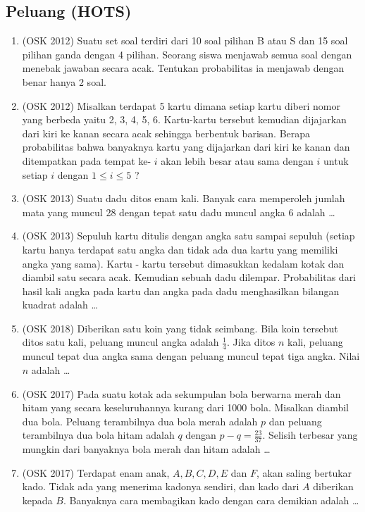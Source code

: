 \documentclass[12pt]{scrartcl}
\begin{document}
\subsection{Peluang (HOTS)}
\begin{enumerate}
            \item (OSK 2012) Suatu set soal terdiri dari 10 soal pilihan B atau S dan 15 soal pilihan ganda dengan 4 pilihan. Seorang siswa menjawab semua soal dengan menebak jawaban secara acak. Tentukan probabilitas ia menjawab dengan benar hanya 2 soal.
            
            \item (OSK 2012) Misalkan terdapat 5 kartu dimana setiap kartu diberi nomor yang berbeda yaitu 2, 3, 4, 5, 6. Kartu-kartu tersebut kemudian dijajarkan dari kiri ke kanan secara acak sehingga berbentuk barisan. Berapa probabilitas bahwa banyaknya kartu yang dijajarkan dari kiri ke kanan dan ditempatkan pada tempat ke- $i$ akan lebih besar atau sama dengan $i$ untuk setiap $i$ dengan $1 \le i \le 5$ ?
            
            \item (OSK 2013) Suatu dadu ditos enam kali. Banyak cara memperoleh jumlah mata yang muncul 28 dengan tepat satu dadu muncul angka 6 adalah \dots
            
            \item (OSK 2013) Sepuluh kartu ditulis dengan angka satu sampai sepuluh (setiap kartu hanya terdapat satu angka dan tidak ada dua kartu yang memiliki angka yang sama). Kartu - kartu tersebut dimasukkan kedalam kotak dan diambil satu secara acak. Kemudian sebuah dadu dilempar. Probabilitas dari hasil kali angka pada kartu dan angka pada dadu menghasilkan bilangan kuadrat adalah \dots
            
            \item (OSK 2018) Diberikan satu koin yang tidak seimbang. Bila koin tersebut ditos satu kali, peluang muncul angka adalah $\frac{1}{4}$. Jika ditos $n$ kali, peluang muncul tepat dua angka sama dengan peluang muncul tepat tiga angka. Nilai $n$ adalah \dots
            
            \item (OSK 2017) Pada suatu kotak ada sekumpulan bola berwarna merah dan hitam yang secara keseluruhannya kurang dari 1000 bola. Misalkan diambil dua bola. Peluang terambilnya dua bola merah adalah $p$ dan peluang terambilnya dua bola hitam adalah $q$ dengan $p-q =\frac{23}{37}$. Selisih terbesar yang mungkin dari banyaknya bola merah dan hitam adalah \dots
            
            \item (OSK 2017) Terdapat enam anak, $A, B, C, D, E$ dan $F$, akan saling bertukar kado. Tidak ada yang menerima kadonya sendiri, dan kado dari $A$ diberikan kepada $B$. Banyaknya cara membagikan kado dengan cara demikian adalah \dots
        \end{enumerate}
\end{document}

